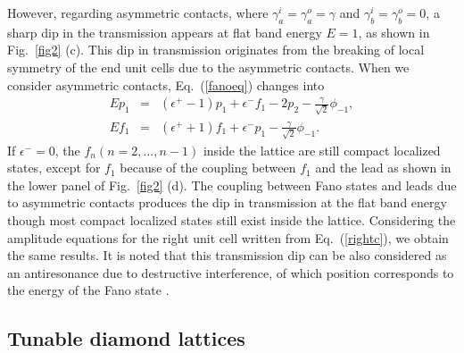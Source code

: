 \documentclass[twocolumn,showpacs,epsfig,pre]{revtex4}
\begin{document}
However, regarding asymmetric contacts, where $\gamma_a^{i} = \gamma_a^{o} = \gamma$ and $\gamma_b^{i}=\gamma_b^{o}=0$, a sharp dip in the transmission appears at flat band energy $E=1$, as shown in Fig.~\ref{fig2} (c).
This dip in transmission originates from the breaking of local symmetry of the end unit cells due to the asymmetric contacts.
When we consider asymmetric contacts, Eq.~(\ref{fanoeq}) changes into
\begin{eqnarray}
\label{fanoeq_a}
E p_1&=& (\epsilon^{+} - 1) p_1 + \epsilon^{-} f_1 - 2 p_2 - \frac{\gamma}{\sqrt{2}} \phi_{-1}, \\\nonumber
E f_1 &=&  (\epsilon^{+} + 1) f_1 + \epsilon^{-} p_1 - \frac{\gamma}{\sqrt{2}} \phi_{-1}.
\end{eqnarray}
If $\epsilon^{-} = 0$, the $f_n (n=2,\dots,n-1)$ inside the lattice are still compact localized states, except for $f_1$ because of the coupling between $f_{1}$ and the lead as shown in the lower panel of Fig.~\ref{fig2} (d). The coupling between Fano states and leads due to asymmetric contacts produces the dip in transmission at the flat band energy though most compact localized states still exist inside the lattice. Considering the amplitude equations for the right unit cell written from Eq.~(\ref{rightc}), we obtain the same results. It is noted that this transmission dip can be also considered as an antiresonance due to destructive interference, of which position corresponds to the energy of the Fano state \cite{Wan02, Ore03, Ore03b, Bao05}. 

\subsection{Tunable diamond lattices}
\end{document}
